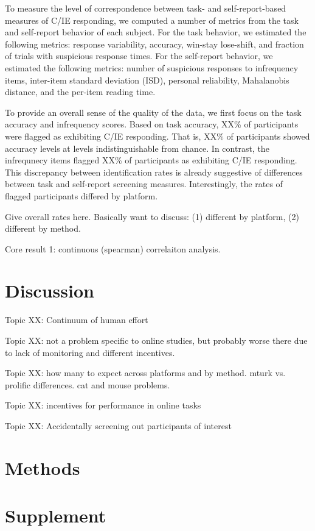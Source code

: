 \documentclass[a4paper,notitlepage,12pt]{article}
\begin{document}
To measure the level of correspondence between task- and self-report-based measures of C/IE responding, we computed a number of metrics from the task and self-report behavior of each subject. For the task behavior, we estimated the following metrics: response variability, accuracy, win-stay lose-shift, and fraction of trials with suspicious response times. For the self-report behavior, we estimated the following metrics: number of suspicious responses to infrequency items, inter-item standard deviation (ISD), personal reliability, Mahalanobis distance, and the per-item reading time. 

To provide an overall sense of the quality of the data, we first focus on the task accuracy and infrequency scores. Based on task accuracy, XX\% of participants were flagged as exhibiting C/IE responding. That is, XX\% of participants showed accuracy levels at levels indistinguishable from chance. In contrast, the infrequnecy items flagged XX\% of participants as exhibiting C/IE responding. This discrepancy between identification rates is already suggestive of differences between task and self-report screening measures. Interestingly, the rates of flagged participants differed by platform. 

Give overall rates here. Basically want to discuss: (1) different by platform, (2) different by method. 

Core result 1: continuous (spearman) correlaiton analysis. 

\subsection{}

\section{Discussion}

Topic XX: Continuum of human effort

Topic XX: not a problem specific to online studies, but probably worse there due to lack of monitoring and different incentives.

Topic XX: how many to expect across platforms and by method. mturk vs. prolific differences. cat and mouse problems.

Topic XX: incentives for performance in online tasks

Topic XX: Accidentally screening out participants of interest

\section{Methods}

\section{Supplement}


\end{document}

